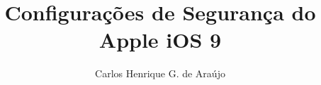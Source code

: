 \documentclass[12pt,oneside]{book}
\begin{document}
\frontmatter

\title{Configura\c c\~oes de Seguran\c ca do Apple iOS 9}
\author{Carlos Henrique G. de Ara\'ujo}

\maketitle

\tableofcontents

\mainmatter







\appendix

\end{document}
